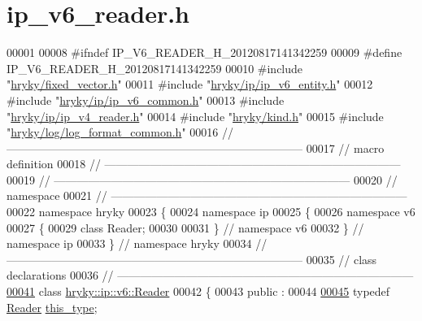 \hypertarget{ip__v6__reader_8h_source}{\section{ip\-\_\-v6\-\_\-reader.\-h}
}

\begin{DoxyCode}
00001 
00008 \textcolor{preprocessor}{#ifndef IP\_V6\_READER\_H\_20120817141342259}
00009 \textcolor{preprocessor}{}\textcolor{preprocessor}{#define IP\_V6\_READER\_H\_20120817141342259}
00010 \textcolor{preprocessor}{}\textcolor{preprocessor}{#include "\hyperlink{fixed__vector_8h}{hryky/fixed_vector.h}"}
00011 \textcolor{preprocessor}{#include "\hyperlink{ip__v6__entity_8h}{hryky/ip/ip_v6_entity.h}"}
00012 \textcolor{preprocessor}{#include "\hyperlink{ip__v6__common_8h}{hryky/ip/ip_v6_common.h}"}
00013 \textcolor{preprocessor}{#include "\hyperlink{ip__v4__reader_8h}{hryky/ip/ip_v4_reader.h}"}
00014 \textcolor{preprocessor}{#include "\hyperlink{kind_8h}{hryky/kind.h}"}
00015 \textcolor{preprocessor}{#include "\hyperlink{log__format__common_8h}{hryky/log/log_format_common.h}"}
00016 \textcolor{comment}{//
      ------------------------------------------------------------------------------}
00017 \textcolor{comment}{// macro definition}
00018 \textcolor{comment}{//
      ------------------------------------------------------------------------------}
00019 \textcolor{comment}{//
      ------------------------------------------------------------------------------}
00020 \textcolor{comment}{// namespace}
00021 \textcolor{comment}{//
      ------------------------------------------------------------------------------}
00022 \textcolor{keyword}{namespace }hryky
00023 \{
00024 \textcolor{keyword}{namespace }ip
00025 \{
00026 \textcolor{keyword}{namespace }v6
00027 \{
00029     \textcolor{keyword}{class }Reader;
00030 
00031 \} \textcolor{comment}{// namespace v6}
00032 \} \textcolor{comment}{// namespace ip}
00033 \} \textcolor{comment}{// namespace hryky}
00034 \textcolor{comment}{//
      ------------------------------------------------------------------------------}
00035 \textcolor{comment}{// class declarations}
00036 \textcolor{comment}{//
      ------------------------------------------------------------------------------}
\hypertarget{ip__v6__reader_8h_source_l00041}{}\hyperlink{classhryky_1_1ip_1_1v6_1_1_reader}{00041} \textcolor{comment}{}\textcolor{keyword}{class }\hyperlink{classhryky_1_1ip_1_1v6_1_1_reader}{hryky::ip::v6::Reader}
00042 \{
00043 \textcolor{keyword}{public} :
00044 
\hypertarget{ip__v6__reader_8h_source_l00045}{}\hyperlink{classhryky_1_1ip_1_1v6_1_1_reader_a8e77e03500cfbbc0da2b0bc14f30c0d8}{00045}     \textcolor{keyword}{typedef} \hyperlink{classhryky_1_1ip_1_1v6_1_1_reader}{Reader} \hyperlink{classhryky_1_1ip_1_1v6_1_1_reader_a8e77e03500cfbbc0da2b0bc14f30c0d8}{this_type};

\end{DoxyCode}
